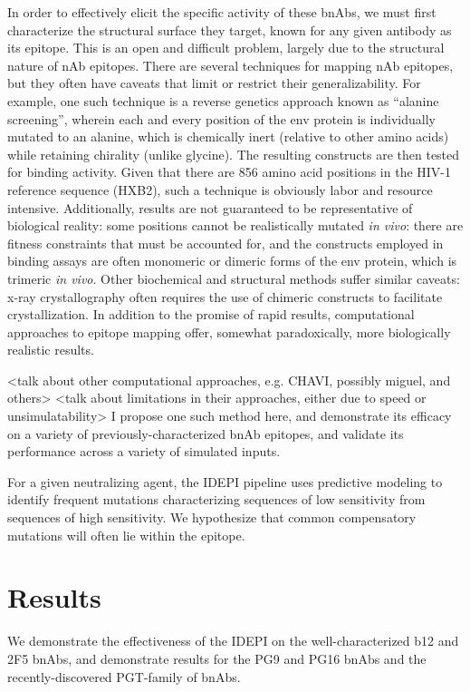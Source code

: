 \documentclass[10pt]{article}
\newcommand{\idepi}{{IDEPI}}
\newcommand{\hiv}{{HIV}-1}
\begin{document}
In order to effectively elicit the specific activity of these bnAbs,
we must first characterize the structural surface they target,
known for any given antibody as its epitope.
This is an open and difficult problem, largely due to the structural nature of nAb epitopes.
There are several techniques for mapping nAb epitopes, but they often have caveats that limit or restrict their generalizability.
For example, one such technique is a reverse genetics approach known as “alanine screening”,
wherein each and every position of the env protein is individually mutated to an alanine,
which is chemically inert (relative to other amino acids) while retaining chirality (unlike glycine).
The resulting constructs are then tested for binding activity.
Given that there are 856 amino acid positions in the \hiv{} reference sequence ({HXB2}),
such a technique is obviously labor and resource intensive.
Additionally, results are not guaranteed to be representative of biological reality:
some positions cannot be realistically mutated \emph{in vivo}:
there are fitness constraints that must be accounted for,
and the constructs employed in binding assays are often monomeric or dimeric forms of the env protein, which is trimeric \emph{in vivo}.
Other biochemical and structural methods suffer similar caveats:
x-ray crystallography often requires the use of chimeric constructs to facilitate crystallization.
In addition to the promise of rapid results, computational approaches to epitope mapping offer, somewhat paradoxically, more biologically realistic results.

<talk about other computational approaches, e.g. CHAVI, possibly miguel, and others>
<talk about limitations in their approaches, either due to speed or unsimulatability> I propose one such method here, and demonstrate its efficacy on a variety of previously-characterized bnAb epitopes, and validate its performance across a variety of simulated inputs.

For a given neutralizing agent,
the \idepi{} pipeline uses predictive modeling to identify frequent mutations characterizing sequences of low sensitivity from sequences of high sensitivity.
We hypothesize that common compensatory mutations will often lie within the epitope.

\section*{Results}

We demonstrate the effectiveness of the \idepi{} on the well-characterized b12 and 2F5 bnAbs,
and demonstrate results for the PG9 and PG16 bnAbs and the recently-discovered PGT-family of bnAbs.
\end{document}
